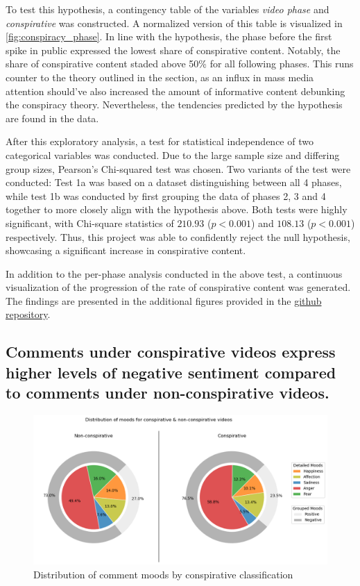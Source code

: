 \documentclass[fontsize=11pt, parskip=half]{scrartcl}
\begin{document}
    To test this hypothesis, a contingency table of the variables \textit{video phase} and \textit{conspirative} was constructed. A normalized version of this table is visualized in \ref{fig:conspiracy_phase}. In line with the hypothesis, the phase before the first spike in public expressed the lowest share of conspirative content. Notably, the share of conspirative content staded above 50\% for all following phases. This runs counter to the theory outlined in the  section, as an influx in mass media attention should've also increased the amount of informative content debunking the conspiracy theory. Nevertheless, the tendencies predicted by the hypothesis are found in the data.
    
    After this exploratory analysis, a test for statistical independence of two categorical variables was conducted. Due to the large sample size and differing group sizes, Pearson's Chi-squared test was chosen. Two variants of the test were conducted: Test 1a was based on a dataset distinguishing between all 4 phases, while test 1b was conducted by first grouping the data of phases 2, 3 and 4 together to more closely align with the hypothesis above. Both tests were highly significant, with Chi-square statistics of $210.93$ ($p < 0.001$) and $108.13$ ($p < 0.001$) respectively. Thus, this project was able to confidently reject the null hypothesis, showcasing a significant increase in conspirative content.    

    In addition to the per-phase analysis conducted in the above test, a continuous visualization of the progression of the rate of conspirative content was generated. The findings are presented in the additional figures provided in the \href{https://github.com/julia-king-edu/so-24_smda_project}{github repository}. 

    \subsection{Comments under conspirative videos express higher levels of negative sentiment compared to comments under non-conspirative videos.}

    \begin{figure}
        \centering
        \vspace{-20pt}
        \setlength\intextsep{0pt}
        \includegraphics[width=0.58 \textwidth]{img/moods_conspirative-pie.png}
        \vspace{-5pt}
        \caption{Distribution of comment moods by conspirative classification}
        \vspace{-10pt}
        \label{fig:moods_conspirative-pie}
    \end{figure}
\end{document}

